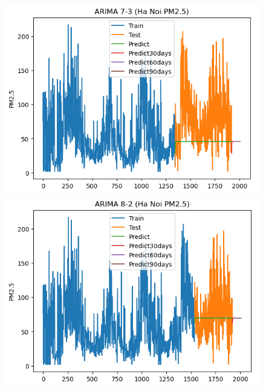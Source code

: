 
\begin{figure}[H]

    \centering
    \begin{minipage}{0.15\textwidth}
    \centering
    \end{minipage}
    \hfill

    \begin{minipage}{0.15\textwidth}
    \centering
    \includegraphics[width=1\textwidth]{img/final/ARIMA/90D/ARIMA_7_3_HN.png}
    \end{minipage}
    \hfill
    \begin{minipage}{0.15\textwidth}
    \centering
    \includegraphics[width=1\textwidth]{img/final/ARIMA/90D/ARIMA_8_2_HN.png}
    \end{minipage}

\end{figure}

